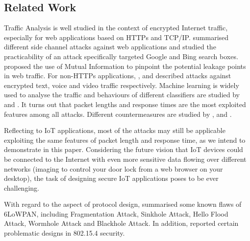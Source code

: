 \subsection{Related Work}

Traffic Analysis is well studied in the context of encrypted Internet traffic, especially for web applications based on HTTPs and TCP/IP. \cite{WebSidechannel} summarised different side channel attacks against web applications and \cite{SuggestBox} studied the practicability of an attack specifically targeted Google and Bing search boxes. \cite{PinpointWeb} proposed the use of Mutual Information to pinpoint the potential leakage points in web traffic. For non-HTTPs applications, \cite{AppleMsg}, \cite{Language} and \cite{VideoTraffic} described attacks against encrypted text, voice and video traffic respectively. Machine learning is widely used to analyse the traffic and behaviours of different classifiers are studied by \cite{HClassifier} and \cite{Peekaboo}. It turns out that packet lengths and response times are the most exploited features among all attacks. Different countermeasures are studied by \cite{TrafficMorphing}, \cite{HTTPOS} and \cite{FTE}.

Reflecting to IoT applications, most of the attacks may still be applicable exploiting the same features of packet length and response time, as we intend to demonstrate in this paper. Considering the future vision that IoT devices could be connected to the Internet with even more sensitive data flowing over different networks (imaging to control your door lock from a web browser on your desktop), the task of designing secure IoT applications poses to be ever challenging.

With regard to the aspect of protocol design, \cite{6LoWPANAtk} summarised some known flaws of 6LoWPAN, including Fragmentation Attack\cite{FragAtk}, Sinkhole Attack\cite{Sinkhole}, Hello Flood Attack\cite{HelloFlood}, Wormhole Attack\cite{Wormhole} and Blackhole Attack\cite{Blackhole}. In addition, \cite{802154SecIssues} reported certain problematic designs in 802.15.4 security\cite{802154}.